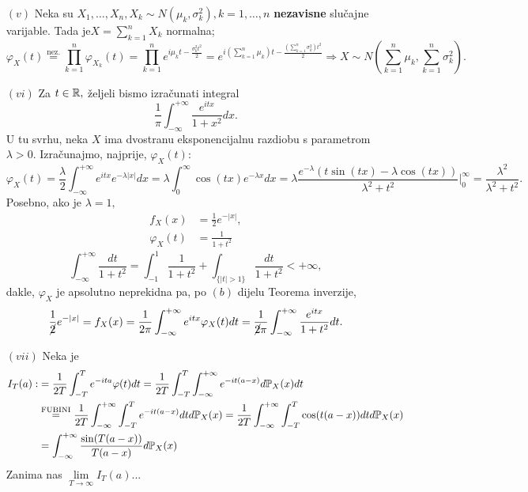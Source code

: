 \documentclass{article}
\begin{document}
\begin{enumerate}
    \item[\((v)\)] Neka su \(X_1,\ldots,X_n,X_k\sim N(\mu_k,\sigma_k^2),k=1,\ldots,n\) \textbf{nezavisne} slučajne varijable. Tada je\newline \(X=\sum_{k=1}^nX_k\) normalna; \[\varphi_X(t)\overset{\text{nez.}}{=}\prod_{k=1}^n\varphi_{X_k}(t)=\prod_{k=1}^ne^{i\mu_k t-\frac{\sigma_k^2t^2}2}=e^{i\left(\sum_{k=1}^n\mu_k\right)t-\frac{\left(\sum_{k=1}^n\sigma_k^2\right)t^2}2}\Rightarrow X\sim N\left(\sum_{k=1}^n\mu_k,\sum_{k=1}^n\sigma_k^2\right).\] 
    \item[\((vi)\)] Za \(t\in\Bbb R,\) željeli bismo izračunati integral \[\frac1\pi\int_{-\infty}^{+\infty}\frac{e^{itx}}{1+x^2}dx.\] U tu svrhu, neka \(X\) ima dvostranu eksponencijalnu razdiobu s parametrom \(\lambda>0.\) Izračunajmo, najprije, \(\varphi_X(t):\) \[\varphi_X(t)=\frac\lambda2\int_{-\infty}^{+\infty}e^{itx}e^{-\lambda|x|}dx=\lambda\int_0^\infty\cos(tx)e^{-\lambda x}dx=\lambda\frac{e^{-\lambda}(t\sin(tx)-\lambda\cos(tx))}{\lambda^2+t^2}\big|_0^\infty=\frac{\lambda^2}{\lambda^2+t^2}.\] Posebno, ako je \(\lambda=1,\) \[\begin{aligned}f_X(x)&=\frac12e^{-|x|},\\\varphi_X(t)&=\frac1{1+t^2}\end{aligned}\] \[\int_{-\infty}^{+\infty}\frac{dt}{1+t^2}=\int_{-1}^1\frac1{1+t^2}+\int_{\{|t|>1\}}\frac{dt}{1+t^2}<+\infty,\] dakle, \(\varphi_X\) je apsolutno neprekidna pa, po \((b)\) dijelu Teorema inverzije, \[\frac1{\cancel 2}e^{-|x|}=f_X(x)=\frac1{2\pi}\int_{-\infty}^{+\infty}e^{itx}\varphi_X(t)dt=\frac1{{\cancel 2}\pi}\int_{-\infty}^{+\infty}\frac{e^{itx}}{1+t^2}dt.\]
    \item[\((vii)\)] Neka je \[\begin{aligned}I_T(a):&=\frac1{2T}\int_{-T}^Te^{-ita}\varphi(t)dt=\frac1{2T}\int_{-T}^T\int_{-\infty}^{+\infty}e^{-it(a-x)}d\Bbb P_X(x)dt\\&\overset{\text{FUBINI}}{=}\frac1{2T}\int_{-\infty}^{+\infty}\int_{-T}^Te^{-it(a-x)}dtd\Bbb P_X(x)=\frac1{2T}\int_{-\infty}^{+\infty}\int_{-T}^T\cos(t(a-x))dtd\Bbb P_X(x)\\&=\int_{-\infty}^{+\infty}\frac{\sin(T(a-x))}{T(a-x)}d\Bbb P_X(x)\end{aligned}\] Zanima nas \(\lim\limits_{T\to\infty}I_T(a)\)...

\end{enumerate}
\end{document}
